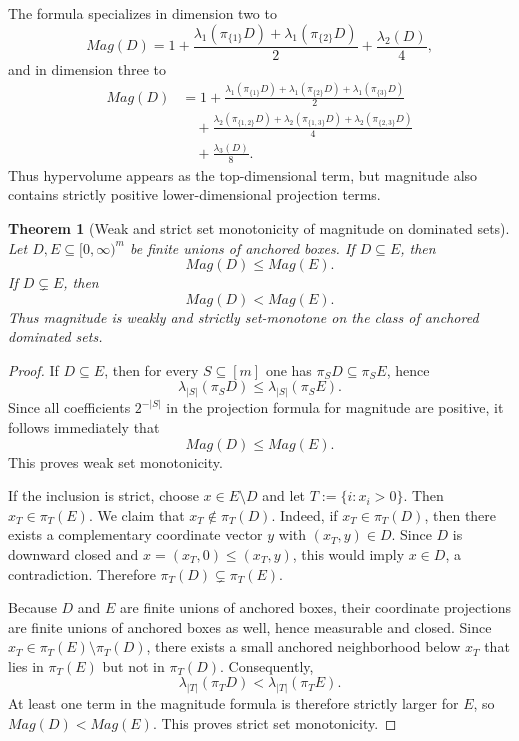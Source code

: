 \documentclass{article}
\def\Mag{Mag}%
\newtheorem{theorem}{Theorem}[section]
\theoremstyle{definition}
\newcommand{\Mag}{\operatorname{Mag}}
\newcommand{\1}{\mathbf{1}}
\newcommand{\proj}{\pi}
\begin{document}
The formula specializes in dimension two to
\[
\Mag(D)=1+\frac{\lambda_1(\proj_{\{1\}}D)+\lambda_1(\proj_{\{2\}}D)}{2}+\frac{\lambda_2(D)}{4},
\]
and in dimension three to
\begin{align*}
\Mag(D)&=1+\frac{\lambda_1(\proj_{\{1\}}D)+\lambda_1(\proj_{\{2\}}D)+\lambda_1(\proj_{\{3\}}D)}{2}\\
&\quad+\frac{\lambda_2(\proj_{\{1,2\}}D)+\lambda_2(\proj_{\{1,3\}}D)+\lambda_2(\proj_{\{2,3\}}D)}{4}\\
&\quad+\frac{\lambda_3(D)}{8}.
\end{align*}
Thus hypervolume appears as the top-dimensional term, but magnitude also contains strictly positive lower-dimensional projection terms.

\begin{theorem}[Weak and strict set monotonicity of magnitude on dominated sets]
Let $D,E\subseteq [0,\infty)^m$ be finite unions of anchored boxes. If $D\subseteq E$, then
\[
\Mag(D)\le \Mag(E).
\]
If $D\subsetneq E$, then
\[
\Mag(D)<\Mag(E).
\]
Thus magnitude is weakly and strictly set-monotone on the class of anchored dominated sets.
\end{theorem}

\begin{proof}
If $D\subseteq E$, then for every $S\subseteq [m]$ one has $\proj_S D\subseteq \proj_S E$, hence
\[
\lambda_{|S|}(\proj_S D)\le \lambda_{|S|}(\proj_S E).
\]
Since all coefficients $2^{-|S|}$ in the projection formula for magnitude are positive, it follows immediately that
\[
\Mag(D)\le \Mag(E).
\]
This proves weak set monotonicity.

If the inclusion is strict, choose $x\in E\setminus D$ and let $T:=\{i:x_i>0\}$. Then $x_T\in \proj_T(E)$. We claim that $x_T\notin \proj_T(D)$. Indeed, if $x_T\in \proj_T(D)$, then there exists a complementary coordinate vector $y$ with $(x_T,y)\in D$. Since $D$ is downward closed and $x=(x_T,0)\le (x_T,y)$, this would imply $x\in D$, a contradiction. Therefore $\proj_T(D)\subsetneq \proj_T(E)$.

Because $D$ and $E$ are finite unions of anchored boxes, their coordinate projections are finite unions of anchored boxes as well, hence measurable and closed. Since $x_T\in \proj_T(E)\setminus \proj_T(D)$, there exists a small anchored neighborhood below $x_T$ that lies in $\proj_T(E)$ but not in $\proj_T(D)$. Consequently,
\[
\lambda_{|T|}(\proj_T D)<\lambda_{|T|}(\proj_T E).
\]
At least one term in the magnitude formula is therefore strictly larger for $E$, so $\Mag(D)<\Mag(E)$. This proves strict set monotonicity.
\end{proof}
\end{document}
